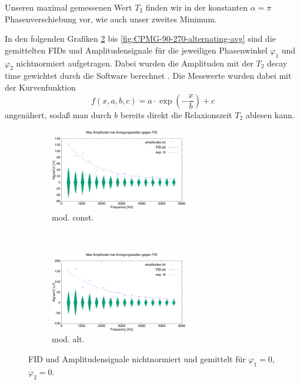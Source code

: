 \documentclass{article}
\begin{document}
            Unseren maximal gemessenen Wert $T_2$ finden wir in der konstanten $\alpha = \pi$ Phasenverschiebung vor, wie auch unser zweites Minimum.

            In den folgenden Grafiken \ref{fig:CPMG-0-0-alternating-avg} bis \ref{fig:CPMG-90-270-alternating-avg} sind die gemittelten FIDs und Amplitudensignale für die jeweiligen Phasenwinkel $\varphi_1$ und $\varphi_2$ nichtnormiert aufgetragen. Dabei wurden die Amplituden mit der $T_2$ decay time gewichtet durch die Software berechnet \cite[ch 5.3.1]{doc:EFNMRStudentManual}. Die Messwerte wurden dabei mit der Kurvenfunktion 
            \[
                f(x,a,b,c) = a\cdot \exp(-\frac{x}{b}) + c
            \]
            angenähert, sodaß man durch $b$ bereits direkt die Relaxionszeit $T_2$ ablesen kann. 
        \begin{figure}[H]
            \centering
            \begin{subfigure}[b]{0.4\textwidth}
                \centering
                \includegraphics[width=6cm]{../Bilddateien/CPMG-0-0-constant-avg.png}
                \caption{mod. const.}
                \label{fig:CPMG-0-0-constant-avg}
            \end{subfigure}
            \
            \begin{subfigure}[b]{0.4\textwidth}
                \centering
                \includegraphics[width=6cm]{../Bilddateien/CPMG-0-0-alternating-avg.png}
                \caption{mod. alt.}
                \label{fig:CPMG-0-0-alternating-avg}
            \end{subfigure}
            \caption{FID und Amplitudensignale nichtnormiert und gemittelt für $\varphi_1 = 0$, $\varphi_2 = 0$.}
            \label{fig:CPMG-0-0-avg}
        \end{figure}
\end{document}
